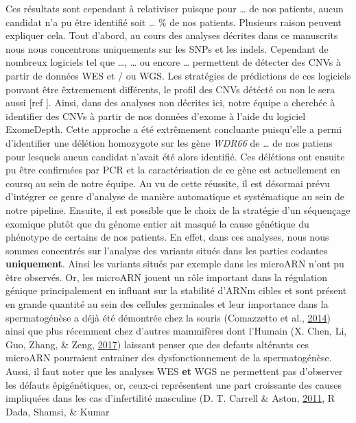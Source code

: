 \documentclass[12pt,twoside]{reedthesis}
\theoremstyle{definition}
\theoremstyle{definition}
\theoremstyle{remark}
\begin{document}
  Ces résultats sont cependant à relativiser puisque pour \ldots{} de nos
  patients, aucun candidat n'a pu être identifié soit \ldots{} \% de nos
  patients. Plusieurs raison peuvent expliquer cela. Tout d'abord, au
  cours des analyses décrites dans ce manuscrits nous nous concentrons
  uniquements sur les SNPs et les indels. Cependant de nombreux logiciels
  tel que \ldots{}, \ldots{} ou encore \ldots{} permettent de détecter des
  CNVs à partir de données WES et / ou WGS. Les stratégies de prédictions
  de ces logiciels pouvant être êxtremement différents, le profil des CNVs
  détécté ou non le sera aussi {[}ref {]}. Ainsi, dans des analyses non
  décrites ici, notre équipe a cherchée à identifier des CNVs à partir de
  nos données d'exome à l'aide du logiciel ExomeDepth. Cette approche a
  été extrêmement concluante puisqu'elle a permi d'identifier une délétion
  homozygote sur les gène \emph{WDR66} de \ldots{} de nos patiens pour
  lesquels aucun candidat n'avait été alors identifié. Ces délétions ont
  ensuite pu être confirmées par PCR et la caractérisation de ce gène est
  actuellement en coursq au sein de notre équipe. Au vu de cette réussite,
  il est désormai prévu d'intégrer ce genre d'analyse de manière
  automatique et systématique au sein de notre pipeline. Ensuite, il est
  possible que le choix de la stratégie d'un séquençage exomique plutôt
  que du génome entier ait masqué la cause génétique du phénotype de
  certains de nos patients. En effet, dans ces analyses, nous nous sommes
  concentrés sur l'analyse des variants situés dans les parties codantes
  \textbf{uniquement}. Ainsi les variants situés par exemple dans les
  microARN n'ont pu être observés. Or, les microARN jouent un rôle
  important dans la régulation génique principalement en influant sur la
  stabilité d'ARNm cibles et sont présent en grande quantité au sein des
  cellules germinales et leur importance dans la spermatogénèse a déjà été
  démontrée chez la souris (Comazzetto et al.,
  \protect\hyperlink{ref-Comazzetto2014}{2014}) ainsi que plus récemment
  chez d'autres mammifères dont l'Humain (X. Chen, Li, Guo, Zhang, \&
  Zeng, \protect\hyperlink{ref-Chen2017}{2017}) laissant penser que des
  defauts altérants ces microARN pourraient entrainer des
  dysfonctionnement de la spermatogénèse. Aussi, il faut noter que les
  analyses WES \textbf{et} WGS ne permettent pas d'observer les défauts
  épigénétiques, or, ceux-ci représentent une part croissante des causes
  impliquées dans les cas d'infertilité masculine (D. T. Carrell \& Aston,
  \protect\hyperlink{ref-Carrell2011}{2011}, R Dada, Shamsi, \& Kumar
\end{document}
